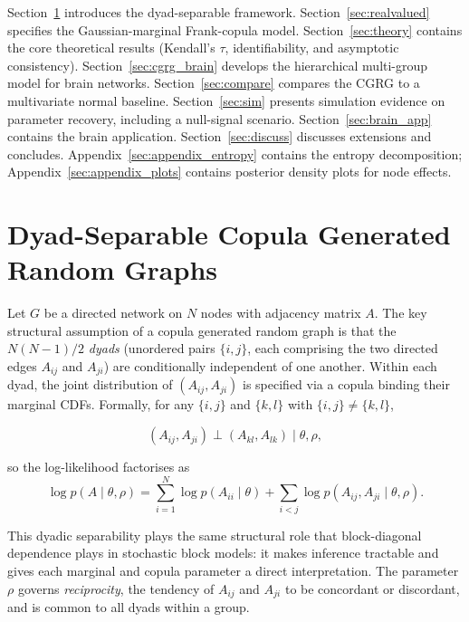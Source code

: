 \documentclass[12pt]{article}
\begin{document}
Section~\ref{sec:cgrg} introduces the dyad-separable framework.
Section~\ref{sec:realvalued} specifies the Gaussian-marginal Frank-copula
model.  Section~\ref{sec:theory} contains the core theoretical results
(Kendall's $\tau$, identifiability, and asymptotic consistency).
Section~\ref{sec:cgrg_brain} develops the hierarchical multi-group model
for brain networks.  Section~\ref{sec:compare} compares the CGRG to a
multivariate normal baseline.  Section~\ref{sec:sim} presents simulation
evidence on parameter recovery, including a null-signal scenario.
Section~\ref{sec:brain_app} contains the brain application.
Section~\ref{sec:discuss} discusses extensions and concludes.
Appendix~\ref{sec:appendix_entropy} contains the entropy decomposition;
Appendix~\ref{sec:appendix_plots} contains posterior density plots for node
effects.

\section{Dyad-Separable Copula Generated Random Graphs}
\label{sec:cgrg}

Let $G$ be a directed network on $N$ nodes with adjacency matrix $A$.  The
key structural assumption of a copula generated random graph is that the
$N(N-1)/2$ \emph{dyads} (unordered pairs $\{i,j\}$, each comprising the
two directed edges $A_{ij}$ and $A_{ji}$) are conditionally independent of
one another.  Within each dyad, the joint distribution of $(A_{ij}, A_{ji})$
is specified via a copula binding their marginal CDFs.  Formally, for any
$\{i,j\}$ and $\{k,l\}$ with $\{i,j\} \neq \{k,l\}$,

\[
(A_{ij}, A_{ji}) \perp (A_{kl}, A_{lk}) \mid \theta, \rho,
\]

so the log-likelihood factorises as
\begin{equation}
\label{eq:factor}
\log p(A \mid \theta, \rho)
  = \sum_{i=1}^{N}\log p(A_{ii} \mid \theta)
  + \sum_{i < j} \log p(A_{ij}, A_{ji} \mid \theta, \rho).
\end{equation}

This dyadic separability plays the same structural role that block-diagonal
dependence plays in stochastic block models: it makes inference tractable and
gives each marginal and copula parameter a direct interpretation.  The
parameter $\rho$ governs \emph{reciprocity}, the tendency of $A_{ij}$ and
$A_{ji}$ to be concordant or discordant, and is common to all dyads within
a group.
\end{document}
